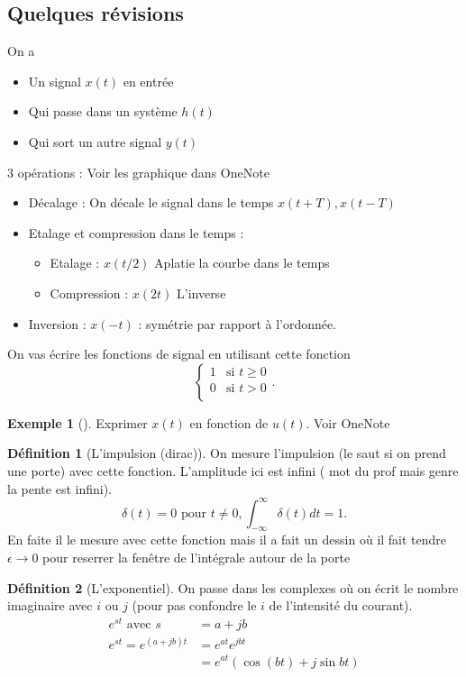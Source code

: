\documentclass{article}
\theoremstyle{plain}%
\theoremstyle{definition}
\newtheorem{defn}{Définition}[section]
\newtheorem{exmp}{Exemple}[section]
\theoremstyle{remark}
\begin{document}
\subsection{Quelques révisions}
On a \begin{itemize}
    \item Un signal $ x(t) $ en entrée
    \item Qui passe dans un système $ h(t) $ 
    \item Qui sort un autre signal $ y(t) $ 
\end{itemize}
3 opérations : Voir les graphique dans OneNote
\begin{itemize}
    \item Décalage : On décale le signal dans le temps $ x(t+T), x(t-T)$ 
    \item Etalage et compression dans le temps : \begin{itemize}
        \item Etalage : $ x(t/2) $ Aplatie la courbe dans le temps 
        \item Compression : $ x(2t) $ L'inverse
    \end{itemize}
    \item Inversion : $ x(-t) $ : symétrie par rapport à l'ordonnée. 
\end{itemize}

On vas écrire les fonctions de signal en utilisant cette fonction
\[
    \begin{cases}
        1 &\text{si } t \geq 0\\
        0 &\text{si } t > 0\\
    \end{cases} 
.\]
\begin{exmp}[]
    Exprimer $ x(t) $ en fonction de $ u(t) $. Voir OneNote
\end{exmp}

\begin{defn}[L'impulsion (dirac)]
    On mesure l'impulsion (le saut si on prend une porte) avec cette fonction. L'amplitude ici est infini ( mot du prof mais genre la pente est infini). 
    \[
        \delta (t) = 0 \text{ pour } t \neq 0 , \int_{- \infty }^{\infty } \delta (t) dt = 1
    .\]
    En faite il le mesure avec cette fonction mais il a fait un dessin où il fait tendre $ \epsilon \to 0 $ pour reserrer la fenêtre de l'intégrale autour de la porte 
\end{defn}

\begin{defn}[L'exponentiel]
    On passe dans les complexes où on écrit le nombre imaginaire avec $ i $ ou $ j $ (pour pas confondre le $ i $ de l'intensité du courant). \begin{align*}
        e^{st} \text{ avec } s &= a + jb \\
        e^{st} = e^{(a+jb)t} &= e^{at} e^{jbt} \\
                            &= e^{at}(\cos (bt) + j \sin bt)
    \end{align*}
\end{defn}
\end{document}
